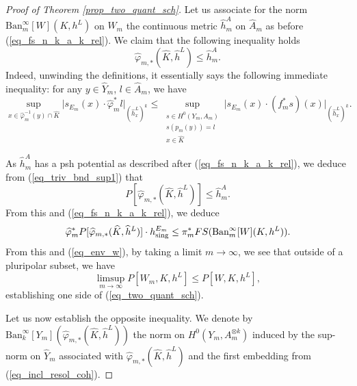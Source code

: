 \documentclass[12pt]{article}
\numberwithin{equation}{section}
\theoremstyle{theorem}
\theoremstyle{definition}
\theoremstyle{remark}
\begin{document}
	\begin{proof}[Proof of Theorem \ref{prop_two_quant_sch}]
		Let us associate for the norm ${\textrm{Ban}}_m^{\infty}[W](K, h^L)$ on $W_m$ the continuous metric $\widehat{h}^A_m$ on $\widehat{A}_m$ as before (\ref{eq_fs_n_k_a_k_rel}).
		We claim that the following inequality holds
		\begin{equation}\label{eq_triv_bnd_sup1}
			\widehat{\varphi}_{m, *} (\widehat{K}, \widehat{h}^L) \leq \widehat{h}^A_m.
		\end{equation}
		Indeed, unwinding the definitions, it essentially says the following immediate inequality: for any $y \in \widehat{Y}_m$, $l \in \widehat{A}_m$, we have
		\begin{equation}
			\sup_{x \in \widehat{\varphi}_m^{-1}(y) \cap \widehat{K}} \big| s_{E_m}(x) \cdot \widehat{\varphi}_m^* l \big|_{(\widehat{h}^L_x)^k}
			\leq
			\sup_{\substack{s \in H^0(Y_m, A_m) \\ s(p_m(y)) = l \\ x \in \widehat{K}}} \big| s_{E_m}(x) \cdot (f_m^* s)(x) \big|_{(\widehat{h}^L_x)^k}.
		\end{equation}
		\par
		As $\widehat{h}^A_m$ has a psh potential as described after (\ref{eq_fs_n_k_a_k_rel}), we deduce from (\ref{eq_triv_bnd_sup1}) that
		\begin{equation}
			P[\widehat{\varphi}_{m, *} (\widehat{K}, \widehat{h}^L)] \leq \widehat{h}^A_m.
		\end{equation}
		From this and (\ref{eq_fs_n_k_a_k_rel}), we deduce
		\begin{equation}
			\widehat{\varphi}_m^* P[\widehat{\varphi}_{m, *} (\widehat{K}, \widehat{h}^L)] \cdot h^{E_m}_{\rm{sing}}
			\leq
			\pi_m^* FS({\textrm{Ban}}_m^{\infty}[W](K, h^L)).
		\end{equation}
		From this and (\ref{eq_env_w}), by taking a limit $m \to \infty$, we see that outside of a pluripolar subset, we have
		\begin{equation}\label{eq_limsup_bnd}
			\limsup_{m \to \infty}
			P[W_m, K, h^L]
			\leq
			P[W, K, h^L],
		\end{equation}
		establishing one side of (\ref{eq_two_quant_sch}).
		\par 
		Let us now establish the opposite inequality. 
		We denote by $\textrm{Ban}_{k}^{\infty}[Y_m](\widehat{\varphi}_{m, *} (\widehat{K}, \widehat{h}^L))$ the norm on $H^0(Y_m, A_m^{\otimes k})$ induced by the sup-norm on $\widehat{Y}_m$ associated with $\widehat{\varphi}_{m, *} (\widehat{K}, \widehat{h}^L)$ and the first embedding from (\ref{eq_incl_resol_coh}).

\end{proof}
\end{document}
